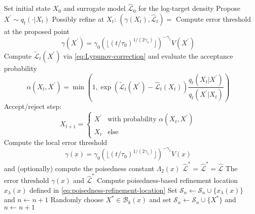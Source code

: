 \begin{algorithm}
 \begin{algorithmic}
    \State Set initial state $X_0$ and surrogate model $\widehat{\mathcal{L}}_0$ for the log-target density 
    \State Propose $X^{\prime} \sim q_t(\cdot \vert X_t)$
    \State
    \State Possibly refine at $X_t$: $(\gamma(X_t), \widehat{\mathcal{L}}_t) = $ 
    \State
    \State Compute error threshold at the proposed point $$\gamma(X^{\prime}) = \gamma_0 (\lfloor (t/\tau_0)^{1/(2\gamma_1)} \rfloor)^{-\gamma_1} V(X^{\prime})$$
    \State
    \State Compute $\widetilde{\mathcal{L}}_t(X^{\prime})$ via \eqref{eq:Lypunov-correction} and evaluate the acceptance probability
    \begin{equation*}
        \alpha(X_t, X^{\prime}) = \min{\left(1, \exp{(\widetilde{\mathcal{L}}_t(X^{\prime})-\widehat{\mathcal{L}}_t(X_t))} \frac{q_t(X_t \vert X^{\prime})}{q_t(X^{\prime} \vert X_t)} \right)}
    \end{equation*}
    \State
    \State Accept/reject step:
    \begin{equation*}
        X_{t+1} = \begin{cases}
        X^{\prime} & \mbox{with probability } \alpha(X_t, X^{\prime}) \\
        X_t & \mbox{else}
    \end{cases}
    \end{equation*}
    \EndFor
  \State Compute the local error threshold $$\gamma(x) = \gamma_0 (\lfloor (t/\tau_0)^{1/(2\gamma_1)} \rfloor)^{-\gamma_1} V(x)$$ and (optionally) compute the poisedness constant $\Lambda_2(x)$
  \State
    \State $\widehat{\mathcal{L}}^{*}$ = 
  \Else{}
    $\widehat{\mathcal{L}}^{*} = \widehat{\mathcal{L}}$
  \EndIf
  \Return The error threshold $\gamma(x)$ and $\widehat{\mathcal{L}}^{*}$
  \EndProcedure
  \State
  \State Compute poisedness-based refinement location $x_{\lambda}(x)$ defined in \eqref{eq:poisedness-refinement-location}
    Set $\mathcal{S}_n \gets \mathcal{S}_n \cup \{x_{\lambda}(x)\}$ and $n \gets n+1$
  \EndIf
    Randomly choose $X^{*} \in \mathcal{B}_k(x)$ and set $\mathcal{S}_n \gets \mathcal{S}_n \cup \{X^{*}\}$ and $n \gets n+1$

\end{algorithmic}
\end{algorithm}
